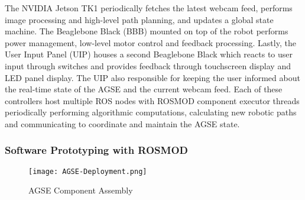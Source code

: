 The NVIDIA Jetson TK1 periodically fetches the latest webcam feed,
performs image processing and high-level path planning, and updates a
global state machine. The Beaglebone Black (BBB) mounted on top of the
robot performs power management, low-level motor control and feedback
processing. Lastly, the User Input Panel (UIP) houses a second
Beaglebone Black which reacts to user input through switches and
provides feedback through touchscreen display and LED panel
display. The UIP also responsible for keeping the user
informed about the real-time state of the AGSE and the current webcam
feed. Each of these controllers host multiple ROS nodes with ROSMOD
component executor threads periodically performing algorithmic
computations, calculating new robotic paths and communicating to
coordinate and maintain the AGSE state.

\subsubsection{Software Prototyping with ROSMOD}

\begin{figure}[h]
	\centering
	\texttt{[image: AGSE-Deployment.png]}
	\caption{AGSE Component Assembly}
	\label{fig:AGSE}
\end{figure}
\FloatBarrier


